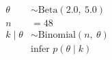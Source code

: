 \begin{align}
  \theta &\sim \mathrm{Beta}(2.0,\ 5.0) \\
  n &= 48 \\
  k \mid \theta &\sim \mathrm{Binomial}(n,\ \theta) \\
  &\text{infer } p(\theta \mid k)
\end{align}
